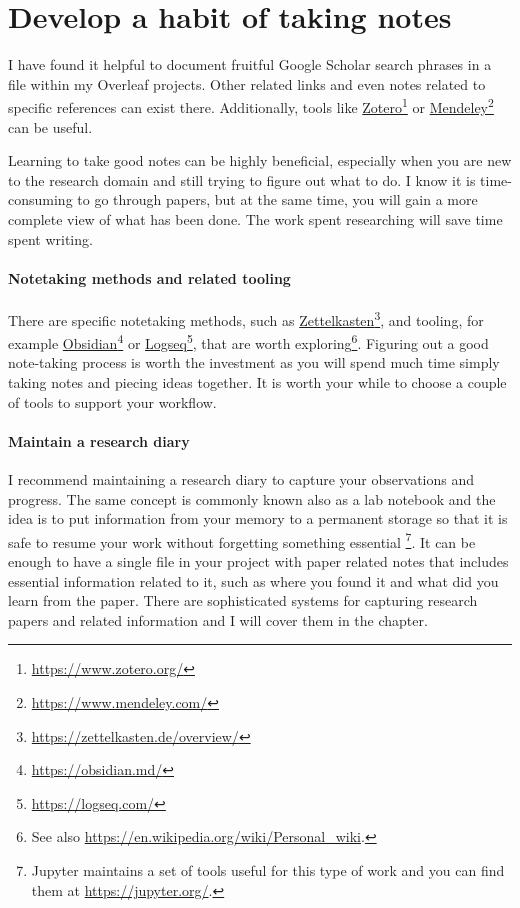 \section{Develop a habit of taking notes}

I have found it helpful to document fruitful Google Scholar search phrases in a file within my Overleaf projects.
Other related links and even notes related to specific references can exist there.
Additionally, tools like \href{https://www.zotero.org/}{Zotero}\footnote{\url{https://www.zotero.org/}} or \href{https://www.mendeley.com/}{Mendeley}\footnote{\url{https://www.mendeley.com/}} can be useful. %

Learning to take good notes can be highly beneficial, especially when you are new to the research domain and still trying to figure out what to do.
I know it is time-consuming to go through papers, but at the same time, you will gain a more complete view of what has been done.
The work spent researching will save time spent writing.

\paragraph{Notetaking methods and related tooling}

There are specific notetaking methods, such as \href{https://zettelkasten.de/overview/}{Zettelkasten}\footnote{\url{https://zettelkasten.de/overview/}}, and tooling, for example \href{https://obsidian.md/}{Obsidian}\footnote{\url{https://obsidian.md/}} or \href{https://logseq.com/}{Logseq}\footnote{\url{https://logseq.com/}}, that are worth exploring\footnote{See also \url{https://en.wikipedia.org/wiki/Personal_wiki}.}.
Figuring out a good note-taking process is worth the investment as you will spend much time simply taking notes and piecing ideas together.
It is worth your while to choose a couple of tools to support your workflow.

\paragraph{Maintain a research diary}

I recommend maintaining a research diary to capture your observations and progress.
The same concept is commonly known also as a lab notebook and the idea is to put information from your memory to a permanent storage so that it is safe to resume your work without forgetting something essential \citep{samlab2020}\footnote{Jupyter maintains a set of tools useful for this type of work and you can find them at \url{https://jupyter.org/}.}.
It can be enough to have a single file in your project with paper related notes that includes essential information related to it, such as where you found it and what did you learn from the paper.
There are sophisticated systems for capturing research papers and related information and I will cover them in the  chapter.

